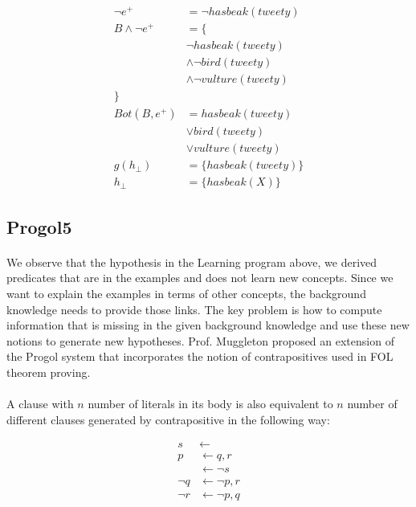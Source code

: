 \documentclass{article}
\theoremstyle{plain}
\theoremstyle{definition}
\begin{document}
\begin{multicols}{2}
\begin{align*}
\lnot e^+ &= \lnot hasbeak(tweety)\\
B \land \lnot e^+ &= \{\\
& \lnot hasbeak(tweety)\\
& \land \lnot bird(tweety) \\
& \land \lnot vulture(tweety)\\
\}&\\
Bot(B, e^+) &= hasbeak(tweety)\\
& \lor bird(tweety)\\
& \lor vulture(tweety)\\
g(h_{\perp}) &= \{ hasbeak(tweety) \}\\
h_{\perp} &= \{ hasbeak(X) \}
\end{align*}

\subsection{Progol5}

\paragraph{} We observe that the hypothesis in the Learning program above, we derived predicates that are in the examples and does not learn new concepts. Since we want to explain the examples in terms of other concepts, the background knowledge needs to provide those links. The key problem is how to compute information that is missing in the given background knowledge and use these new notions to generate new hypotheses. Prof. Muggleton proposed an extension of the Progol system that incorporates the notion of contrapositives used in FOL theorem proving\cite{muggleton00}.

\paragraph{} A clause with $n$ number of literals in its body is also equivalent to $n$ number of different clauses generated by contrapositive in the following way:

\begin{align*}
s &\leftarrow\\
p &\leftarrow q, r\\
&\leftarrow \lnot s\\
\lnot q &\leftarrow \lnot p, r\\
\lnot r &\leftarrow \lnot p, q\\
\end{align*}


\end{multicols}
\end{document}
